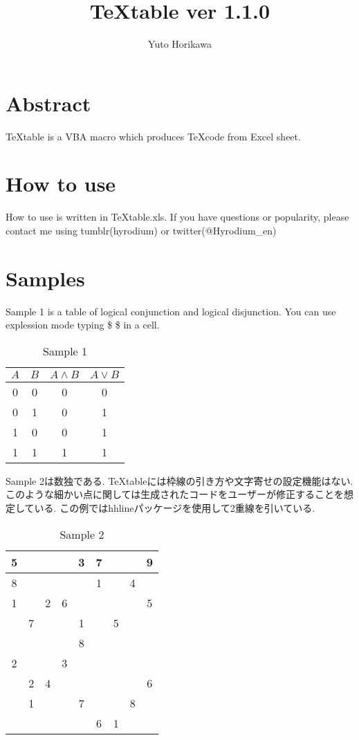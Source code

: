 \documentclass{jsarticle}
\title{TeXtable ver 1.1.0}
\author{Yuto Horikawa}
\begin{document}
\maketitle
\vspace{-3zw}
\section{Abstract}
TeXtable is a VBA macro which produces \TeX  code from Excel sheet.
\section{How to use}
How to use is written in TeXtable.xls.
If you have questions or popularity, please contact me using tumblr(hyrodium) or twitter(@Hyrodium\_en)
\section{Samples}
Sample 1 is a table of logical conjunction and logical disjunction.
You can use explession mode typing \$ \$ in a cell.
\begin{table}[htb]
	\captionsetup{labelformat=empty,labelsep=none}
	\caption{Sample 1}
	\label{sample1}
	\centering
	\begin{tabular}{|c|c|c|c|}\hline
		$A$	&$B$	&$A\land B$	&$A\lor B$	\\ \hline
		0	&0	&0	&0	\\ \hline
		0	&1	&0	&1	\\ \hline
		1	&0	&0	&1	\\ \hline
		1	&1	&1	&1	\\ \hline
	\end{tabular}
\end{table}

Sample 2は数独である.
TeXtableには枠線の引き方や文字寄せの設定機能はない.
このような細かい点に関しては生成されたコードをユーザーが修正することを想定している.
この例ではhhlineパッケージを使用して2重線を引いている.
\vspace{-0.5em}
\begin{table}[htb]
	\captionsetup{labelformat=empty,labelsep=none}
	\caption{Sample 2}
	\label{sample2}
	\centering
	\begin{tabular}{|c|c|c||c|c|c||c|c|c|}\hline
		5	&	&	&	&3	&7	&	&	&9	\\ \hline
		8	&	&	&	&	&1	&	&4	&	\\ \hline
		1	&	&2	&6	&	&	&	&	&5	\\ \hhline{|=|=|=#=|=|=#=|=|=|}
			&7	&	&	&1	&	&5	&	&	\\ \hline
			&	&	&	&8	&	&	&	&	\\ \hline
		2	&	&	&3	&	&	&	&	&	\\ \hhline{|=|=|=#=|=|=#=|=|=|}
			&2	&4	&	&	&	&	&	&6	\\ \hline
			&1	&	&	&7	&	&	&8	&	\\ \hline
			&	&	&	&	&6	&1	&	&	\\ \hline
	\end{tabular}
\end{table}
\end{document}

